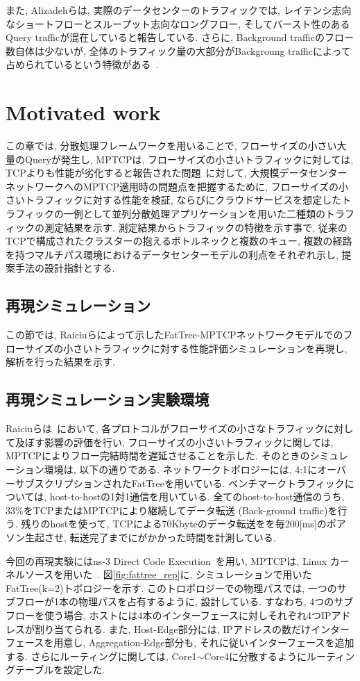 \documentclass[11pt, a4paper, uplatex]{jsarticle}
\begin{document}
また, Alizadehらは, 実際のデータセンターのトラフィックでは, レイテンシ志向なショートフローとスループット志向なロングフロー,
そしてバースト性のあるQuery trafficが混在していると報告している.
さらに, Background trafficのフロー数自体は少ないが,
全体のトラフィック量の大部分がBackgroung trafficによって占められているという特徴がある~\cite{traffic}.


\section{Motivated work}
この章では, 分散処理フレームワークを用いることで, フローサイズの小さい大量のQueryが発生し, MPTCPは,
フローサイズの小さいトラフィックに対しては, TCPよりも性能が劣化すると報告された問題~\cite{improving}に対して, 大規模データセンターネットワークへのMPTCP適用時の問題点を把握するために,
フローサイズの小さいトラフィックに対する性能を検証, ならびにクラウドサービスを想定したトラフィックの一例として並列分散処理アプリケーションを用いた二種類のトラフィックの測定結果を示す.
測定結果からトラフィックの特徴を示す事で, 従来のTCPで構成されたクラスターの抱えるボトルネックと複数のキュー,
複数の経路を持つマルチパス環境におけるデータセンターモデルの利点をそれぞれ示し, 提案手法の設計指針とする.


\subsection{再現シミュレーション}
この節では, Raiciuらによって示したFatTree-MPTCPネットワークモデルでのフローサイズの小さいトラフィックに対する性能評価シミュレーションを再現し,
解析を行った結果を示す.

\subsection{再現シミュレーション実験環境}
Raiciuらは~\cite{improving}において, 各プロトコルがフローサイズの小さなトラフィックに対して及ぼす影響の評価を行い,
フローサイズの小さいトラフィックに関しては, MPTCPによりフロー完結時間を遅延させることを示した.
そのときのシミュレーション環境は, 以下の通りである.
ネットワークトポロジーには, 4:1にオーバーサブスクリプションされたFatTreeを用いている.
ベンチマークトラフィックについては, host-to-hostの1対1通信を用いている.
全てのhost-to-host通信のうち, 33\%をTCPまたはMPTCPにより継続してデータ転送 (Back-ground traffic)を行う.
残りのhostを使って, TCPによる70Kbyteのデータ転送をを毎200[ms]のポアソン生起させ, 転送完了までにがかかった時間を計測している.

今回の再現実験にはns-3 Direct Code Execution~\cite{ns3}を用い, MPTCPは, Linux
カーネルソースを用いた~\cite{mptcp_linux}.
図\ref{fig:fattree_rep}に, シミュレーションで用いたFatTree(k=2)トポロジーを示す.
このトロポロジーでの物理パスでは, 一つのサブフローが1本の物理パスを占有するように, 設計している.
すなわち, 4つのサブフローを使う場合, ホストには4本のインターフェースに対しそれぞれ4つIPアドレスが割り当てられる.
また, Host-Edge部分には, IPアドレスの数だけインターフェースを用意し, Aggregation-Edge部分も,
それに従いインターフェースを追加する.
さらにルーティングに関しては, Core1$\sim$Core4に分散するようにルーティングテーブルを設定した.
\end{document}
